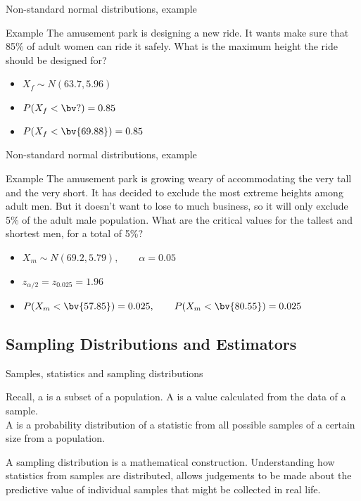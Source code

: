 \documentclass[xcolor=table, handout]{beamer}
\begin{document}
\begin{frame}{Non-standard normal distributions, example}
\begin{exampleblock}{Example}
The amusement park is designing a new ride. It wants make sure that 85\% of adult women can ride it safely. What is the maximum height the ride should be designed for?
\begin{itemize} 
\pause\item $X_f \sim N(63.7, 5.96)$
\pause\item $P(X_f <  \bv ?) = 0.85$
\pause\item $P(X_f <  \bv{69.88}) = 0.85$
\end{itemize}
\end{exampleblock}
\end{frame}

\begin{frame}{Non-standard normal distributions, example}
\begin{exampleblock}{Example}
The amusement park is growing weary of accommodating the very tall and the very short. It has decided to exclude the most extreme heights among adult men. But it doesn't want to lose to much business, so it will only exclude 5\% of the adult male population. What are the critical values for the tallest and shortest men, for a total of 5\%?
\begin{itemize} 
\pause\item $X_m \sim N(69.2, 5.79), \qquad \alpha = 0.05$
\pause\item $z_{\alpha/2} = z_{0.025} = 1.96$
\pause\item $P(X_m <  \bv{57.85}) = 0.025, \qquad P(X_m <  \bv{80.55}) = 0.025$
\end{itemize}

\end{exampleblock}
\end{frame}

\subsection{Sampling Distributions and Estimators}

\begin{frame}{Samples, statistics and sampling distributions}
\begin{block}{}
\large Recall, a  is a subset of a population. A  is a value calculated from the data of a sample.\\
\medskip
A  is a probability distribution of a statistic from all possible samples of a certain size from a population.
\end{block}

\pause
\begin{block}{}
A sampling distribution is a mathematical construction. Understanding how statistics from samples are distributed, allows judgements to be made about the predictive value of individual samples that might be collected in real life.
\end{block}
\end{frame}
\end{document}
